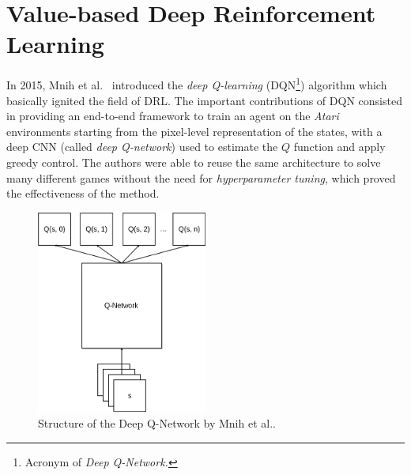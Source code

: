 \section{Value-based Deep Reinforcement Learning} \label{SOA:value}
In 2015, Mnih et al.\ \cite{mnih2015human} introduced the \textit{deep 
Q-learning} (DQN\footnote{Acronym of \textit{Deep Q-Network.}}) algorithm which 
basically ignited the field of DRL.
The important contributions of DQN consisted in providing an end-to-end 
framework to train an agent on the \textit{Atari} environments starting from 
the pixel-level representation of the states, with a deep CNN (called 
\textit{deep Q-network}) used to estimate the $Q$ function and apply greedy 
control. The authors were able to reuse the same architecture to solve many 
different games without the need for \textit{hyperparameter tuning}, which 
proved the effectiveness of the method.
%
\begin{figure}[h]
\includegraphics[width=0.5\textwidth]{pictures/dqn}
\centering
\caption[Structure of the Deep Q-Network by Mnih et al.\ ]{Structure of the Deep Q-Network by Mnih et al..}
\end{figure}
%

